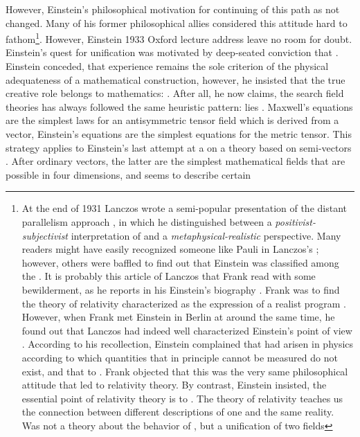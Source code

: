 \documentclass[draft]{article}
\begin{document}
However, Einstein's philosophical motivation for continuing of this path as not changed. Many of his former philosophical allies considered this attitude hard to fathom\footnote{At the end of 1931 Lanczos wrote a semi-popular presentation of the distant parallelism approach \citep{Lanczos1931}, in which he distinguished between a \emph{positivist-subjectivist} interpretation of \rt and a \emph{metaphysical-realistic} perspective. Many readers might have easily recognized someone like Pauli in Lanczos's ; however, others were baffled to find out that Einstein was classified among the . It is probably this article of Lanczos that Frank read with some bewilderment, as he reports in his Einstein's biography \citep{Frank1947}. Frank was  to find the theory of relativity characterized as the expression of a realist program  \citep[215]{Frank1947}. However, when Frank met Einstein in Berlin at around the same time, he found out that Lanczos had indeed well characterized Einstein's point of view \citep[215f.]{Frank1947}. According to his recollection, Einstein complained that  had arisen in physics according to which quantities that in principle cannot be measured do not exist, and that to  \citep[216]{Frank1947}. Frank objected that this was the very same philosophical attitude that led to relativity theory. By contrast, Einstein insisted, the essential point of relativity theory is to   \citep[216]{Frank1947}. The theory of relativity teaches us the connection between different descriptions of one and the same reality. Was not a theory about the behavior of \rac, but a unification of two fields}. However, Einstein 1933 Oxford lecture address leave no room for doubt. Einstein's quest for unification was motivated by deep-seated conviction that  \citep{Einstein1933}. Einstein conceded, that experience remains the sole criterion of the physical adequateness of a mathematical construction, however, he insisted that the true creative role belongs to mathematics:  \citep[167]{Einstein1933}. After all, he now claims, the search field theories has always followed the same heuristic pattern:  lies  \citep[168]{Einstein1933}. Maxwell's equations are the simplest laws for an antisymmetric tensor field which is derived from a vector, Einstein's equations are the simplest equations for the metric tensor\etc. This strategy applies to Einstein's last attempt at a \uft on a theory based on semi-vectors \citep{Einstein1932c,Einstein1933c,Einstein1934b,Einstein1933d}. After ordinary vectors, the latter are the simplest mathematical fields that are possible in four dimensions, and seems to describe certain 
\end{document}
